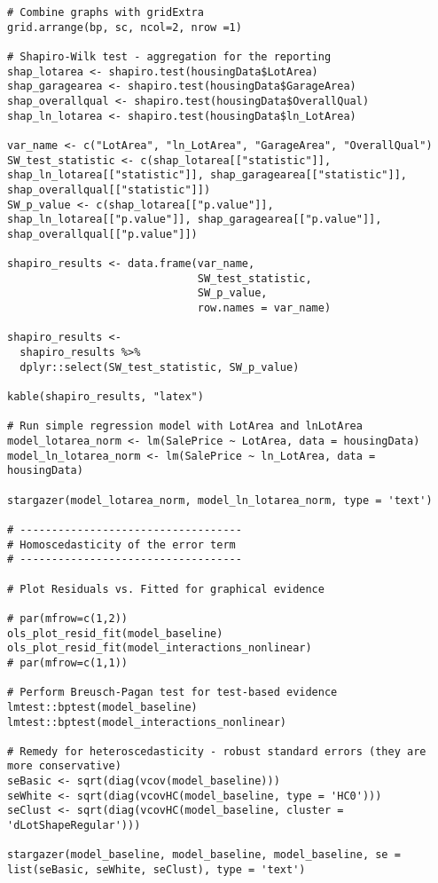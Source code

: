 \documentclass{article}
\begin{document}
\begin{tiny}
\begin{verbatim}
# Combine graphs with gridExtra
grid.arrange(bp, sc, ncol=2, nrow =1)

# Shapiro-Wilk test - aggregation for the reporting
shap_lotarea <- shapiro.test(housingData$LotArea)
shap_garagearea <- shapiro.test(housingData$GarageArea)
shap_overallqual <- shapiro.test(housingData$OverallQual)
shap_ln_lotarea <- shapiro.test(housingData$ln_LotArea)

var_name <- c("LotArea", "ln_LotArea", "GarageArea", "OverallQual")
SW_test_statistic <- c(shap_lotarea[["statistic"]], shap_ln_lotarea[["statistic"]], shap_garagearea[["statistic"]], shap_overallqual[["statistic"]])
SW_p_value <- c(shap_lotarea[["p.value"]], shap_ln_lotarea[["p.value"]], shap_garagearea[["p.value"]], shap_overallqual[["p.value"]])

shapiro_results <- data.frame(var_name,
                              SW_test_statistic,
                              SW_p_value,
                              row.names = var_name)

shapiro_results <-
  shapiro_results %>%
  dplyr::select(SW_test_statistic, SW_p_value)

kable(shapiro_results, "latex")

# Run simple regression model with LotArea and lnLotArea
model_lotarea_norm <- lm(SalePrice ~ LotArea, data = housingData)
model_ln_lotarea_norm <- lm(SalePrice ~ ln_LotArea, data = housingData)

stargazer(model_lotarea_norm, model_ln_lotarea_norm, type = 'text')

# -----------------------------------
# Homoscedasticity of the error term
# -----------------------------------

# Plot Residuals vs. Fitted for graphical evidence

# par(mfrow=c(1,2))
ols_plot_resid_fit(model_baseline)
ols_plot_resid_fit(model_interactions_nonlinear)
# par(mfrow=c(1,1))

# Perform Breusch-Pagan test for test-based evidence
lmtest::bptest(model_baseline)
lmtest::bptest(model_interactions_nonlinear)

# Remedy for heteroscedasticity - robust standard errors (they are more conservative)
seBasic <- sqrt(diag(vcov(model_baseline)))
seWhite <- sqrt(diag(vcovHC(model_baseline, type = 'HC0')))
seClust <- sqrt(diag(vcovHC(model_baseline, cluster = 'dLotShapeRegular')))

stargazer(model_baseline, model_baseline, model_baseline, se = list(seBasic, seWhite, seClust), type = 'text')


\end{verbatim}
\end{tiny}
\end{document}
